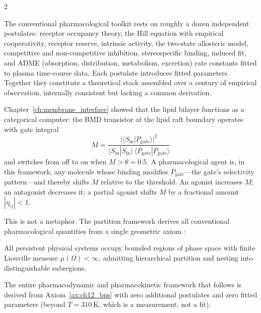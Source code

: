 \begin{multicols}{2}

The conventional pharmacological toolkit rests on roughly a dozen independent postulates: receptor occupancy theory, the Hill equation with empirical cooperativity, receptor reserve, intrinsic activity, the two-state allosteric model, competitive and non-competitive inhibition, stereospecific binding, induced fit, and ADME (absorption, distribution, metabolism, excretion) rate constants fitted to plasma time-course data. Each postulate introduces fitted parameters. Together they constitute a theoretical stack assembled over a century of empirical observation, internally consistent but lacking a common derivation.

Chapter~\ref{ch:membrane_interface} showed that the lipid bilayer functions as a categorical computer: the BMD transistor at the lipid raft boundary operates with gate integral
\begin{equation}
M = \frac{|\langle S_{\mathrm{in}} | P_{\mathrm{gate}} \rangle|^2}{\langle S_{\mathrm{in}}|S_{\mathrm{in}}\rangle\,\langle P_{\mathrm{gate}}|P_{\mathrm{gate}}\rangle}
\end{equation}
and switches from off to on when $M > \theta = 0.5$. A pharmacological agent is, in this framework, any molecule whose binding modifies $P_{\mathrm{gate}}$---the gate's selectivity pattern---and thereby shifts $M$ relative to the threshold. An agonist increases $M$; an antagonist decreases it; a partial agonist shifts $M$ by a fractional amount $|\eta_{ij}| < 1$.

This is not a metaphor. The partition framework derives all conventional pharmacological quantities from a single geometric axiom \citep{sachikonye2024_pharmacodynamics,sachikonye2024_pharmacokinetics}:

\begin{axiom}
\label{ax:ch12_bps}
All persistent physical systems occupy bounded regions of phase space with finite Liouville measure $\mu(\Omega) < \infty$, admitting hierarchical partition and nesting into distinguishable subregions.
\end{axiom}

The entire pharmacodynamic and pharmacokinetic framework that follows is derived from Axiom~\ref{ax:ch12_bps} with zero additional postulates and zero fitted parameters (beyond $T = 310\ \mathrm{K}$, which is a measurement, not a fit).

\end{multicols}

